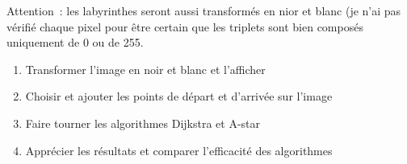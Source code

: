 \documentclass[
]{article}
\begin{document}
Attention~: les labyrinthes seront aussi transformés en nior et blanc
(je n'ai pas vérifié chaque pixel pour être certain que les triplets
sont bien composés uniquement de 0 ou de 255.

\begin{enumerate}
\def\labelenumi{\arabic{enumi}.}
\setcounter{enumi}{10}
\item
  Transformer l'image en noir et blanc et l'afficher
\item
  Choisir et ajouter les points de départ et d'arrivée sur l'image
\item
  Faire tourner les algorithmes Dijkstra et A-star
\item
  Apprécier les résultats et comparer l'efficacité des algorithmes
\end{enumerate}
\end{document}
